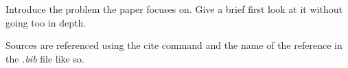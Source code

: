 Introduce the problem the paper focuses on. Give a brief first look at it without going too in depth.

Sources are referenced using the cite command and the name of the reference in the \emph{.bib} file \cite{McCulloch1943} like so.
